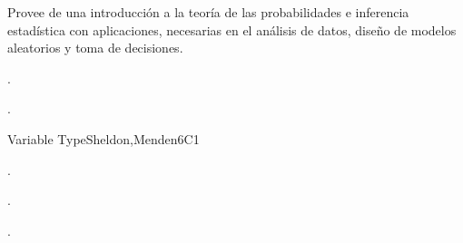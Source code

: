 
\begin{syllabus}


\begin{justification}
Provee de una introducción a la teoría de las probabilidades e inferencia estadística con aplicaciones, necesarias en el análisis de datos, diseño de modelos aleatorios y toma de decisiones.
\end{justification}

\begin{goals}
\item . %
\item . %
\end{goals}

\begin{outcomes}
   \item {}
   \item {}
   \item {}
\end{outcomes}

\begin{competences}
    \item {} 
    \item {}
    \item {}
\end{competences}


\begin{unit}{}{Variable Type}{Sheldon,Menden}{6}{C1}
\begin{topics}
      \item . %
   \end{topics}

   \begin{learningoutcomes}
      \item . %
      \item . %
   \end{learningoutcomes}
\end{unit}


\end{syllabus}
